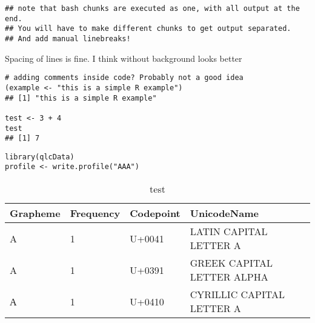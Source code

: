 \documentclass[output=inprep,
		biblatex
		]{LSP/langsci}\usepackage[]{graphicx}\usepackage[]{color}
\makeatletter
\newenvironment{kframe}{%
 \def\at@end@of@kframe{}%
 \ifinner\ifhmode%
  \def\at@end@of@kframe{\end{minipage}}%
  \begin{minipage}{\columnwidth}%
 \fi\fi%
 \def\FrameCommand##1{\hskip\@totalleftmargin \hskip-\fboxsep
 \colorbox{shadecolor}{##1}\hskip-\fboxsep
     \hskip-\linewidth \hskip-\@totalleftmargin \hskip\columnwidth}%
 \MakeFramed {\advance\hsize-\width
   \@totalleftmargin\z@ \linewidth\hsize
   \@setminipage}}%
 {\par\unskip\endMakeFramed%
 \at@end@of@kframe}
\newenvironment{knitrout}{}{} %
\makeatother
\begin{document}
\begin{knitrout}\scriptsize
{}\color{fgcolor}\begin{kframe}
\begin{verbatim}
## note that bash chunks are executed as one, with all output at the end.
## You will have to make different chunks to get output separated.
## And add manual linebreaks!
\end{verbatim}
\end{kframe}
\end{knitrout}

Spacing of lines is fine. I think without background looks better

\begin{knitrout}\scriptsize
{}\color{fgcolor}\begin{kframe}
\begin{verbatim}
# adding comments inside code? Probably not a good idea
(example <- "this is a simple R example")
## [1] "this is a simple R example"

test <- 3 + 4
test
## [1] 7
\end{verbatim}
\end{kframe}
\end{knitrout}

\begin{knitrout}\scriptsize
{}\color{fgcolor}\begin{kframe}
\begin{verbatim}
library(qlcData)
profile <- write.profile("AΑА")
\end{verbatim}
\end{kframe}
\end{knitrout}

\begin{table}[H]
\centering
{\small
\begin{tabular}{llll}
  \toprule
Grapheme & Frequency & Codepoint & UnicodeName \\ 
  \midrule
A & 1 & U+0041 & LATIN CAPITAL LETTER A \\ 
  Α & 1 & U+0391 & GREEK CAPITAL LETTER ALPHA \\ 
  А & 1 & U+0410 & CYRILLIC CAPITAL LETTER A \\ 
   \bottomrule
\end{tabular}
}
\caption{test} 
\label{bla}
\end{table}
\end{document}
